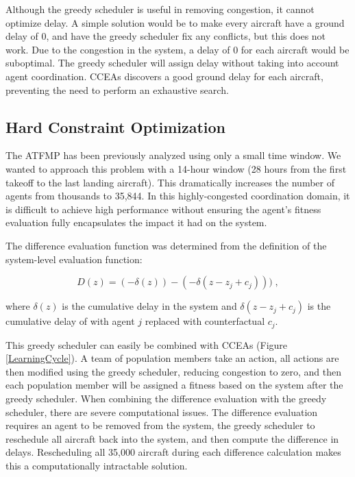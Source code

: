 \documentclass{sig-alternate}
\begin{document}
Although the greedy scheduler is useful in removing congestion, it cannot optimize delay. A simple solution would be to make every aircraft have a ground delay of 0, and have the greedy scheduler fix any conflicts, but this does not work. Due to the congestion in the system, a delay of 0 for each aircraft would be suboptimal. The greedy scheduler will assign delay without taking into account agent coordination. CCEAs discovers a good ground delay for each aircraft, preventing the need to perform an exhaustive search.

\subsection{Hard Constraint Optimization}
The ATFMP has been previously analyzed using only a small time window. We wanted to approach this problem with a 14-hour window (28 hours from the first takeoff to the last landing aircraft). This dramatically increases the number of agents from thousands to 35,844. In this highly-congested coordination domain, it is difficult to achieve high performance without ensuring the agent's fitness evaluation fully encapsulates the impact it had on the system. 

The difference evaluation function was determined from the definition of the system-level evaluation function:

\begin{equation}
D(z) = (-\delta(z)) - (-\delta(z-z_j + c_j)))\;,
\end{equation}

where \textit{$\delta(z)$} is the cumulative delay in the system and \textit{$\delta(z-z_j + c_j)$} is the cumulative delay of with agent $j$ replaced with counterfactual \textit{$c_j$}.

This greedy scheduler can easily be combined with CCEAs (Figure \ref{LearningCycle}). A team of population members take an action, all actions are then modified using the greedy scheduler, reducing congestion to zero, and then each population member will be assigned a fitness based on the system after the greedy scheduler. When combining the difference evaluation with the greedy scheduler, there are severe computational issues. The difference evaluation requires an agent to be removed from the system, the greedy scheduler to reschedule all aircraft back into the system, and then compute the difference in delays. Rescheduling all 35,000 aircraft during each difference calculation makes this a computationally intractable solution. 
\end{document}
